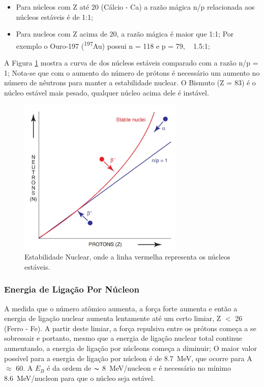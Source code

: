 \documentclass[11pt,a4paper]{article}
\newcounter{exemplo}
\begin{document}
                \begin{itemize}
                    \item Para núcleos com Z até 20 (Cálcio - Ca) a razão mágica n/p relacionada aos núcleos estáveis é de 1:1;
                    \item Para nucleos com Z acima de 20, a razão mágica é maior que 1:1; Por exemplo o Ouro-197 (\textsuperscript{197}Au)  possui n = 118 e p = 79, ~ 1.5:1;
                \end{itemize}

                A Figura \ref{fig:estabilidadeNuclear} mostra a curva de dos núcleos estáveis comparado com a razão n/p = 1; Nota-se que com o aumento do número de prótons é necessário um aumento no número de nêutrons para manter a estabilidade nuclear. O Bismuto (Z = 83) é o núcleo estável mais pesado, qualquer núcleo acima dele é instável.

                \begin{figure}[h]
                    \centering
                    \includegraphics[width=0.7\textwidth]{Imagens/graficoNucleosEstaveis.jpg}
                    \caption{Estabilidade Nuclear, onde a linha vermelha representa os núcleos estáveis.}
                    \label{fig:estabilidadeNuclear}
                \end{figure}
        
            \subsubsection{Energia de Ligação Por Núcleon}
                
                A medida que o número atômico aumenta, a força forte aumenta e então a energia de ligação nuclear aumenta lentamente até um certo limiar, Z $<$ 26 (Ferro - Fe). A partir deste limiar, a força repulsiva entre os prótons começa a se sobressair e portanto, mesmo que a energia de ligação nuclear total continue aumentando, a energia de ligação por núcleons começa a diminuir; O maior valor possível para a energia de ligação por núcleon é de  \qty{8.7}{MeV}, que ocorre para A $\approx$ 60. A $E_B$ é da ordem de $\thicksim$ \qty{8}{MeV/nucleon} e é necessário no mínimo \qty{8.6}{MeV/nucleon} para que o núcleo seja estável.
\end{document}
